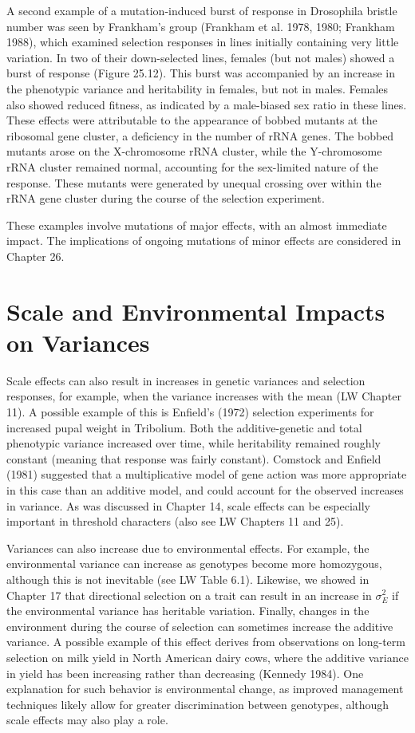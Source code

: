 \documentclass{article}
\begin{document}
A second example of a mutation-induced burst of response in Drosophila bristle number was seen by Frankham's group (Frankham et al. 1978, 1980; Frankham 1988), which examined selection responses in lines initially containing very little variation. In two of their down-selected lines, females (but not males) showed a burst of response (Figure 25.12). This burst was accompanied by an increase in the phenotypic variance and heritability in females, but not in males. Females also showed reduced fitness, as indicated by a male-biased sex ratio in these lines. These effects were attributable to the appearance of bobbed mutants at the ribosomal gene cluster, a deficiency in the number of rRNA genes. The bobbed mutants arose on the X-chromosome rRNA cluster, while the Y-chromosome rRNA cluster remained normal, accounting for the sex-limited nature of the response. These mutants were generated by unequal crossing over within the rRNA gene cluster during the course of the selection experiment.

These examples involve mutations of major effects, with an almost immediate impact. The implications of ongoing mutations of minor effects are considered in Chapter 26.

\section{Scale and Environmental Impacts on Variances}
Scale effects can also result in increases in genetic variances and selection responses, for example, when the variance increases with the mean (LW Chapter 11). A possible example of this is Enfield's (1972) selection experiments for increased pupal weight in Tribolium. Both the additive-genetic and total phenotypic variance increased over time, while heritability remained roughly constant (meaning that response was fairly constant). Comstock and Enfield (1981) suggested that a multiplicative model of gene action was more appropriate in this case than an additive model, and could account for the observed increases in variance. As was discussed in Chapter 14, scale effects can be especially important in threshold characters (also see LW Chapters 11 and 25).

Variances can also increase due to environmental effects. For example, the environmental variance can increase as genotypes become more homozygous, although this is not inevitable (see LW Table 6.1). Likewise, we showed in Chapter 17 that directional selection on a trait can result in an increase in  $ \sigma_{E}^{2} $ if the environmental variance has heritable variation. Finally, changes in the environment during the course of selection can sometimes increase the additive variance. A possible example of this effect derives from observations on long-term selection on milk yield in North American dairy cows, where the additive variance in yield has been increasing rather than decreasing (Kennedy 1984). One explanation for such behavior is environmental change, as improved management techniques likely allow for greater discrimination between genotypes, although scale effects may also play a role.
\end{document}

